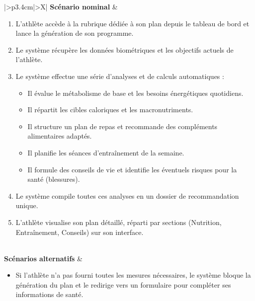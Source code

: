 \documentclass[a4paper,12pt]{report}
\begin{document}
\begin{table}[H]
\begin{tabularx}{\textwidth}{|>{\RaggedRight\arraybackslash}p{3.4cm}|>{\RaggedRight\arraybackslash}X|}
                \textbf{Scénario nominal} &
                \begin{minipage}[t]{\linewidth}
                \vspace{2pt}
                \begin{enumerate}[label=\arabic*., leftmargin=*, topsep=0pt, itemsep=1pt]
                    \item L'athlète accède à la rubrique dédiée à son plan depuis le tableau de bord et lance la génération de son programme.
                        \item Le système récupère les données biométriques et les objectifs actuels de l'athlète.
                            \item Le système effectue une série d'analyses et de calculs automatiques :
                                \begin{itemize}[leftmargin=*, topsep=1pt, itemsep=1pt]
                                        \item Il évalue le métabolisme de base et les besoins énergétiques quotidiens.
                                                \item Il répartit les cibles caloriques et les macronutriments.
                                                        \item Il structure un plan de repas et recommande des compléments alimentaires adaptés.
\item Il planifie les séances d'entraînement de la semaine.
\item Il formule des conseils de vie et identifie les éventuels risques pour la santé (blessures).
\end{itemize}
\item Le système compile toutes ces analyses en un dossier de recommandation unique.
\item L'athlète visualise son plan détaillé, réparti par sections (Nutrition, Entraînement, Conseils) sur son interface.
 \end{enumerate}
\vspace{2pt}
\end{minipage} \\
\hline
 \textbf{Scénarios alternatifs} &
 \begin{minipage}[t]{\linewidth}
 \vspace{2pt}
\begin{itemize}[leftmargin=*, topsep=0pt, itemsep=1pt]
\item  Si l'athlète n'a pas fourni toutes les mesures nécessaires, le système bloque la génération du plan et le redirige vers un formulaire pour compléter ses informations de santé.

\end{itemize}
\end{minipage}
\end{tabularx}
\end{table}
\end{document}
